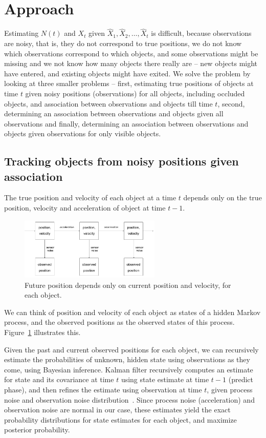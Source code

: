 \documentclass[a4paper]{article}
\newcommand{\X}{\hat{X}}
\begin{document}
\section{Approach}

Estimating $N(t)$ and $X_t$ given $\X_1, \X_2, \ldots, \X_t$ is difficult, because
observations are noisy, that is, they do not correspond to true positions,
we do not know which observations correspond to which objects, and
some observations might be missing and we not know how many objects there 
really are -- new objects might have entered, and existing objects might have exited.
We solve the problem by looking at three smaller problems --
first, estimating true positions of objects at time $t$ given noisy positions
(observations) for all objects, including occluded objects, and association between 
observations and objects till time $t$,
second, determining an association between observations and objects given all
observations
and finally, determining an association between observations and objects given
observations for only visible objects.

\subsection{Tracking objects from noisy positions given association}

The true position and velocity of each object at a time $t$ depends only on 
the true position, velocity and acceleration of object at time $t-1$.
\begin{figure}[h]
  \centering
  \includegraphics[width=0.6\textwidth]{images/hmm.png}
  \caption{Future position depends only on current position and velocity,
  for each object.}
  \label{fig:HMM}
\end{figure}
We can think of position and velocity of each object as states of a hidden Markov
process, and the observed positions as the observed states of this process.
Figure~\ref{fig:HMM} illustrates this.

Given the past and current observed positions for each object, we can recursively
estimate the probabilities of unknown, hidden state using observations as they come,
using Bayesian inference.
Kalman filter recursively computes an estimate for state and its covariance at
time $t$ using state estimate at time $t-1$ (predict phase),
and then refines the estimate using observation at time $t$, given
process noise and observation noise distribution~\cite{kalman}.
Since process noise (acceleration) and observation noise are normal in our case,
these estimates yield the exact probability distributions for state estimates for
each object, and maximize posterior probability.
\end{document}
